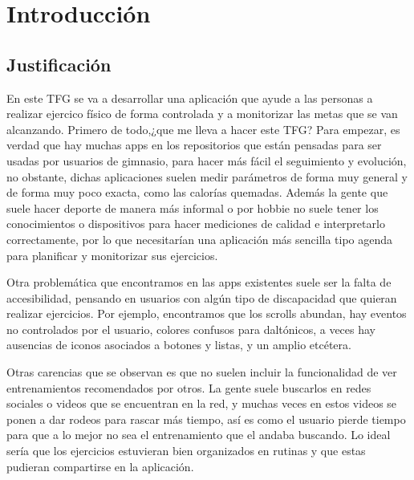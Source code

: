 \chapter{Introducción}

\section{Justificación}

En este TFG se va a desarrollar una aplicación que ayude a las personas a realizar ejercico físico de forma controlada y a monitorizar las metas que se van alcanzando.
Primero de todo,¿que me lleva a hacer este TFG? Para empezar, es verdad que hay muchas apps en los repositorios que están pensadas para ser usadas por usuarios de gimnasio, para hacer más fácil el seguimiento y evolución, no obstante, dichas aplicaciones suelen medir parámetros de forma muy general y de forma muy poco exacta, como las calorías quemadas.
Además la gente que suele hacer deporte de manera más informal o por hobbie no suele tener los conocimientos o dispositivos para hacer mediciones de calidad e interpretarlo correctamente, por lo que necesitarían una aplicación más sencilla tipo agenda para planificar y monitorizar sus ejercicios. 

Otra problemática que encontramos en las apps existentes suele ser la falta de accesibilidad, pensando en usuarios con algún tipo de discapacidad que quieran realizar ejercicios. Por ejemplo, encontramos que los scrolls abundan, hay eventos no controlados por el usuario, colores confusos para daltónicos, a veces hay ausencias de iconos asociados a botones y listas, y un amplio etcétera. 

Otras carencias que se observan es que no suelen incluir la funcionalidad de ver entrenamientos recomendados por otros. La gente suele buscarlos en redes sociales o videos que se encuentran en la red, y muchas veces en estos videos se ponen a dar rodeos para rascar más tiempo, así es como el usuario pierde tiempo para que a lo mejor no sea el entrenamiento que el andaba buscando. Lo ideal sería que los ejercicios estuvieran bien organizados en rutinas y que estas pudieran compartirse en la aplicación.

